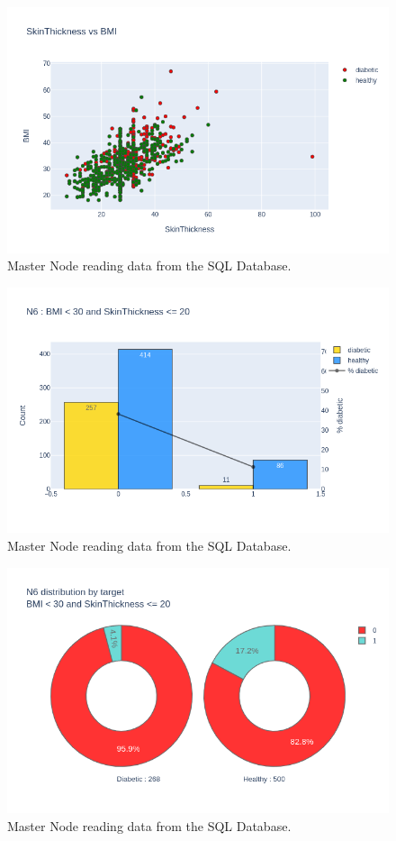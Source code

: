 \documentclass[12pt]{article}
\begin{document}
\begin{figure}[ht]
\centering
\includegraphics[width=1\textwidth]{newplot(25).png}
\caption{Master Node reading data from the SQL Database.}
\end{figure}

\begin{figure}[ht]
\centering
\includegraphics[width=1\textwidth]{newplot(26).png}
\caption{Master Node reading data from the SQL Database.}
\end{figure}

\begin{figure}[ht]
\centering
\includegraphics[width=1\textwidth]{newplot(27).png}
\caption{Master Node reading data from the SQL Database.}
\end{figure}
\end{document}
